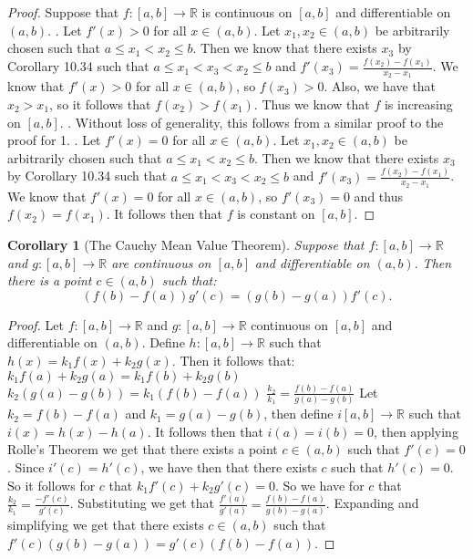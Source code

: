 \documentclass[12pt]{article}
\newcommand{\bbR}{\mathbb{R}}
\providecommand{\arr}{\longrightarrow}
\renewcommand{\_}[1]{\underline{ #1 }}
\newtheorem{corollary}[theorem]{Corollary}
\theoremstyle{definition}
\numberwithin{equation}{subsection}
\begin{document}
\begin{proof}
Suppose that $f:[a,b] \to \bbR$ is continuous on $[a,b]$ and differentiable on $(a,b)$. . Let $f'(x) > 0$ for all $x \in (a,b)$. Let $x_1, x_2 \in (a,b)$ be arbitrarily chosen such that $a \leq x_1 < x_2 \leq b$. Then we know that there exists $x_3$ by Corollary 10.34 such that $a \leq x_1 < x_3 < x_2 \leq b$ and $f'(x_3) = \frac{f(x_2)-f(x_1)}{x_2-x_1}$. We know that $f'(x) > 0$ for all $x \in (a,b)$, so $f(x_3) > 0$. Also, we have that $x_2 > x_1$, so it follows that $f(x_2) > f(x_1)$. Thus we know that $f$ is increasing on $[a,b]$. . Without loss of generality, this follows from a similar proof to the proof for 1. . Let $f'(x) = 0$ for all $x \in (a,b)$. Let $x_1, x_2 \in (a,b)$ be arbitrarily chosen such that $a \leq x_1 < x_2 \leq b$. Then we know that there exists $x_3$ by Corollary 10.34 such that $a \leq x_1 < x_3 < x_2 \leq b$ and $f'(x_3) = \frac{f(x_2)-f(x_1)}{x_2-x_1}$. We know that $f'(x) = 0$ for all $x \in (a,b)$, so $f'(x_3) = 0$ and thus $f(x_2) = f(x_1)$. It follows then that $f$ is constant on $[a,b]$.
\end{proof}



\begin{corollary}[The Cauchy Mean Value Theorem] 

Suppose that $f\colon [a,b]\arr\bbR$ and $g\colon[a,b]\arr \bbR$ are continuous on $[a,b]$ and differentiable on $(a,b).$ Then there is a point $c\in (a,b)$ such that:
\[
(f(b)-f(a))g'(c)=(g(b)-g(a))f'(c).
\]
\end{corollary}

\begin{proof}
Let $f:[a,b] \to \bbR$ and $g:[a,b] \to \bbR$ continuous on $[a,b]$ and differentiable on $(a,b)$. Define $h:[a,b] \to \bbR$ such that $h(x) = k_1f(x) + k_2g(x)$. Then it follows that: \newline
$k_1f(a) + k_2g(a) = k_1f(b) + k_2g(b)$ \newline
$k_2(g(a) - g(b)) = k_1(f(b) - f(a))$ \newline
$\frac{k_2}{k_1} = \frac{f(b) - f(a)}{g(a)-g(b)}$ \newline
Let $k_2 = f(b) - f(a)$ and $k_1 = g(a) - g(b)$, then define $i[a,b] \to \bbR$ such that $i(x) = h(x) - h(a)$. It follows then that $i(a) = i(b) = 0$, then applying Rolle's Theorem we get that there exists a point $c \in (a,b)$ such that $f'(c) = 0$. Since $i'(c) = h'(c)$, we have then that there exists $c$ such that $h'(c) = 0$. So it follows for $c$ that $k_1f'(c) + k_2g'(c) = 0$. So we have for $c$ that $\frac{k_2}{k_1} = \frac{-f'(c)}{g'(c)}$. Substituting we get that $\frac{f'(a)}{g'(a)} = \frac{f(b)-f(a)}{g(b) - g(a)}$. Expanding and simplifying we get that there exists $c \in (a,b)$ such that $f'(c)(g(b) - g(a)) = g'(c)(f(b)-f(a))$.
\end{proof}
\end{document}
